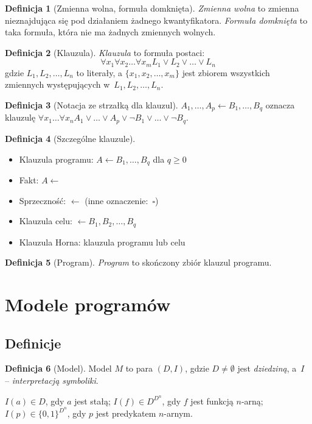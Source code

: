 \documentclass[10pt,a4paper]{article}
\theoremstyle{plain}
\theoremstyle{definition}
\newtheorem*{definition}{Definicja}
\begin{document}
\begin{definition}[Zmienna wolna, formuła domknięta]
  \emph{Zmienna wolna} to zmienna nieznajdująca się pod działaniem żadnego
  kwantyfikatora. \emph{Formuła domknięta} to taka formuła, która 
  nie ma żadnych zmiennych wolnych.
\end{definition}

\begin{definition}[Klauzula]
  \emph{Klauzula} to formuła postaci:
  \[
    \forall x_1 \forall x_2 \ldots \forall x_m
      L_1 \lor L_2 \lor \ldots \lor  L_n
  \]
  gdzie $L_1, L_2, \ldots, L_n$ to literały, a $\lbrace x_1, x_2, \ldots, x_m
  \rbrace$ jest zbiorem wszystkich zmiennych występujących
  w~$L_1, L_2,\ldots, L_n$.
\end{definition}

\begin{definition}[Notacja ze strzałką dla klauzul]
$A_1,\ldots,A_p \leftarrow B_1,\ldots,B_q$ oznacza klauzulę
$\forall x_1 \ldots \forall x_n
  A_1 \lor \ldots \lor A_p\lor
  \lnot B_1 \lor \ldots \lor \lnot B_q$.
\end{definition}

\begin{definition}[Szczególne klauzule]
  ~\begin{itemize}
    \item Klauzula programu: $A \leftarrow B_1,\ldots,B_q$ dla $q \ge 0$
    \item Fakt: $A \leftarrow$
    \item Sprzeczność: $\leftarrow$ (inne oznaczenie:~$\square$)
    \item Klauzula celu: $\leftarrow B_1,B_2,\ldots,B_q$
    \item Klauzula Horna: klauzula programu lub celu
  \end{itemize}
\end{definition}

\begin{definition}[Program]
  \emph{Program} to skończony zbiór klauzul programu.
\end{definition}

\section{Modele programów}
\subsection{Definicje}
\begin{definition}[Model]
  Model $M$ to para $(D, I)$, gdzie $D \ne \emptyset$ jest \emph{dziedziną},
  a~$I$ -- \emph{interpretacją symboliki}. 

  $I(a) \in D$, gdy $a$ jest stałą; $I(f) \in D^{D^n}$, gdy $f$ jest funkcją
  $n$-arną; $I(p) \in \lbrace 0, 1 \rbrace^{D^n}$, gdy $p$ jest predykatem
  $n$-arnym.
\end{definition}
\end{document}
